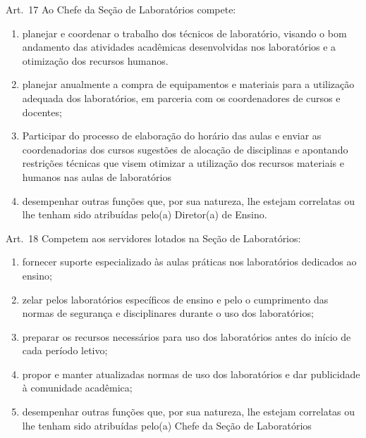 \documentclass[a4paper,12pt]{report}
\begin{document}
Art.~17 Ao Chefe da Seção de Laboratórios compete:

\begin{enumerate}
\renewcommand{\labelenumi}{\Roman{enumi}}

\item planejar e coordenar o trabalho dos técnicos de laboratório, visando o bom andamento 
      das atividades acadêmicas desenvolvidas nos laboratórios e a otimização dos recursos 
      humanos.

\item planejar anualmente a compra de equipamentos e materiais para a utilização adequada 
      dos laboratórios, em parceria com os coordenadores de cursos e docentes;

\item Participar do processo de elaboração do horário das aulas e enviar as coordenadorias 
      dos cursos sugestões de alocação de disciplinas e apontando restrições técnicas que 
      visem otimizar a utilização dos recursos materiais e humanos nas aulas de laboratórios

\item desempenhar outras funções que, por sua natureza, lhe estejam correlatas ou lhe 
      tenham sido atribuídas pelo(a) Diretor(a) de Ensino.
\end{enumerate}


Art.~18 Competem aos servidores lotados na Seção de Laboratórios:

\begin{enumerate}
\renewcommand{\labelenumi}{\Roman{enumi}}

\item fornecer suporte especializado às aulas práticas nos laboratórios dedicados ao 
      ensino;

\item zelar pelos laboratórios específicos de ensino e pelo o cumprimento das normas 
      de segurança e disciplinares durante o uso dos laboratórios;

\item preparar os recursos necessários para uso dos laboratórios antes do início de cada 
      período letivo; 

\item propor e manter atualizadas normas de uso dos laboratórios e dar publicidade à 
      comunidade acadêmica;

\item desempenhar outras funções que, por sua natureza, lhe estejam correlatas ou lhe 
      tenham sido atribuídas pelo(a) Chefe da Seção de Laboratórios
\end{enumerate}
\end{document}
